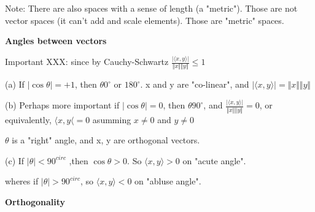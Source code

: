 Note: There are also spaces with a sense of length (a "metric"). Those are not vector spaces (it can't add and scale elements). Those are "metric" spaces.

\vspace{0.5cm}
\noindent\textbf{Angles between vectors}

Important XXX: since by Cauchy-Schwartz $\frac{\vert \langle x,y\rangle\vert}{\Vert x\Vert \Vert y\Vert}\leq 1$

(a) If $\vert\cos\theta\vert = +1$, then $\theta 0^{\circ}$ or $180^{\circ}$. x and y are "co-linear", and $\vert\langle x,y\rangle\vert=\Vert x\Vert \Vert y\Vert$

\begin{marginfigure}
	\centering
	\resizebox{7.5cm}{3cm}{}
	\caption{}
	\label{}
\end{marginfigure}

\begin{marginfigure}
	\centering
	\resizebox{7.5cm}{3cm}{}
	\caption{}
	\label{}
\end{marginfigure}

(b) Perhaps more important if $\vert\cos\theta\vert = 0$, then $\theta 90^{\circ}$, and $\frac{\vert\langle x,y\rangle\vert}{\Vert x\Vert \Vert y\Vert}=0$, or equivalently, $\langle x,y\langle=0$ asumming $x\neq 0$ and $y\neq 0$

\begin{marginfigure}
	\centering
	\resizebox{7.5cm}{3cm}{}
	\caption{}
	\label{}
\end{marginfigure}

$\theta$ is a "right" angle, and x, y are orthogonal vectors.

(c) If $\vert \theta\vert <90^{circ}$ ,then $\cos\theta >0$. So $\langle x,y\rangle >0$ on "acute angle".

\begin{marginfigure}
	\centering
	\resizebox{7.5cm}{3cm}{}
	\caption{}
	\label{}
\end{marginfigure}

\begin{marginfigure}
	\centering
	\resizebox{7.5cm}{3cm}{}
	\caption{}
	\label{}
\end{marginfigure}

wheres if $\vert \theta\vert >90^{circ}$, so $\langle x,y\rangle <0$ on "abluse angle".

\vspace{0.5cm}
\noindent\textbf{Orthogonality}

